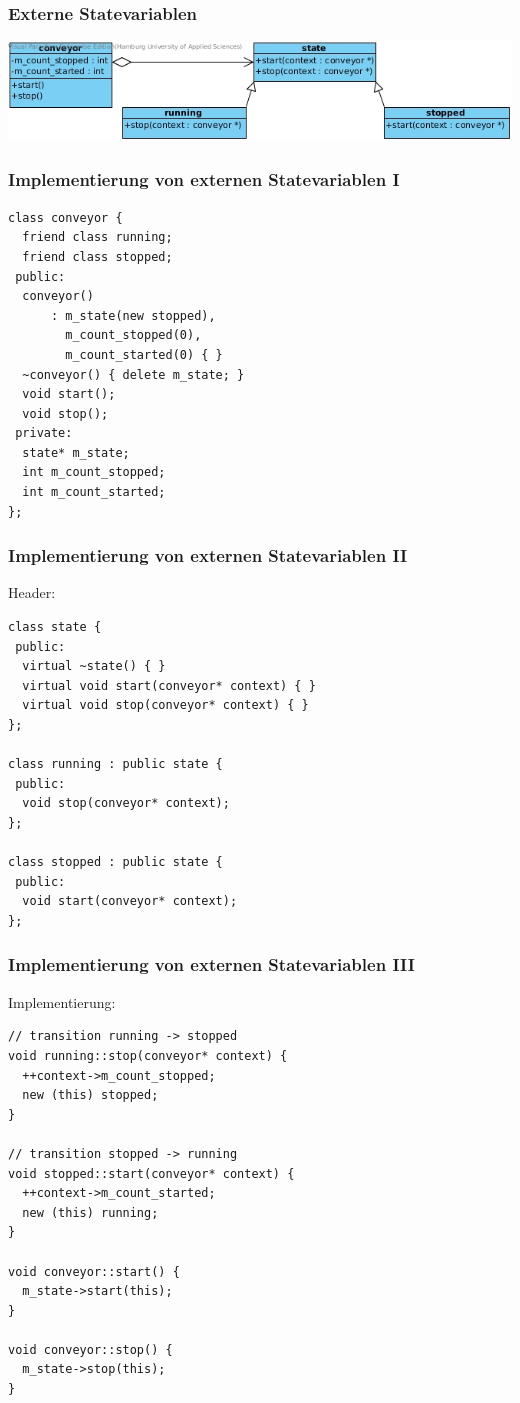 \documentclass{beamer}
\begin{document}
\begin{frame}
 \frametitle{Externe Statevariablen}
 \includegraphics[scale=.44]{img/fsm_externe_state_var.jpg}
\end{frame}

\begin{frame}[fragile]
 \frametitle{Implementierung von externen Statevariablen I}
 \begin{lstlisting}
class conveyor {
  friend class running;
  friend class stopped;
 public:
  conveyor()
      : m_state(new stopped),
        m_count_stopped(0),
        m_count_started(0) { }
  ~conveyor() { delete m_state; }
  void start();
  void stop();
 private:
  state* m_state;
  int m_count_stopped;
  int m_count_started;
};
\end{lstlisting}
\end{frame}

\begin{frame}[fragile]
 \frametitle{Implementierung von externen Statevariablen II}
 Header:
 \begin{lstlisting}
class state {
 public:
  virtual ~state() { }
  virtual void start(conveyor* context) { }
  virtual void stop(conveyor* context) { }
};

class running : public state {
 public:
  void stop(conveyor* context);
};

class stopped : public state {
 public:
  void start(conveyor* context);
};
 \end{lstlisting}
\end{frame}

\begin{frame}[fragile]
 \frametitle{Implementierung von externen Statevariablen III}
 Implementierung:
 \begin{lstlisting}
// transition running -> stopped
void running::stop(conveyor* context) {
  ++context->m_count_stopped;
  new (this) stopped;
}

// transition stopped -> running
void stopped::start(conveyor* context) {
  ++context->m_count_started;
  new (this) running;
}

void conveyor::start() {
  m_state->start(this);
}

void conveyor::stop() {
  m_state->stop(this);
}
 \end{lstlisting}
\end{frame}
\end{document}
